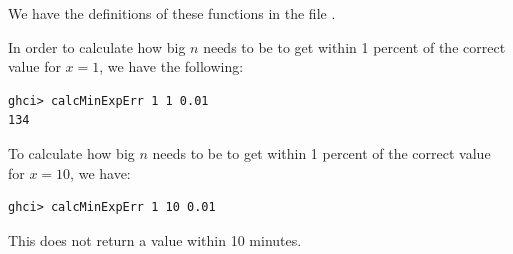 We have the definitions of these functions in the file
.

In order to calculate how big $n$ needs to be to get within 1 percent of the correct 
value for $x = 1$, we have the following:
\begin{lstlisting}
ghci> calcMinExpErr 1 1 0.01
134
\end{lstlisting}
To calculate how big $n$ needs to be to get within 1 percent of the correct value for
$x = 10$, we have:
\begin{lstlisting}
ghci> calcMinExpErr 1 10 0.01
\end{lstlisting}
This does not return a value within 10 minutes.
